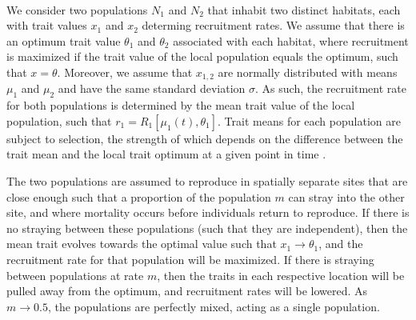 \documentclass[twocolumn,preprintnumbers,amsmath,amssymb,superscriptaddress]{revtex4}
\begin{document}
\\
\noindent We consider two populations $N_1$ and $N_2$ that inhabit two distinct habitats, each with trait values $x_1$ and $x_2$ determing recruitment rates.
We assume that there is an optimum trait value $\theta_1$ and $\theta_2$ associated with each habitat, where recruitment is maximized if the trait value of the local population equals the optimum, such that $x = \theta$.
Moreover, we assume that $x_{1,2}$ are normally distributed with means $\mu_1$ and $\mu_2$ and have the same standard deviation $\sigma$.
As such, the recruitment rate for both populations is determined by the mean trait value of the local population, such that $r_1 = R_1[\mu_1(t),\theta_1]$.
Trait means for each population are subject to selection, the strength of which depends on the difference between the trait mean and the local trait optimum at a given point in time \cite{simpson1953major,Lande:1976ga}.

The two populations are assumed to reproduce in spatially separate sites that are close enough such that a proportion of the population $m$ can stray into the other site, and where mortality occurs before individuals return to reproduce.
If there is no straying between these populations (such that they are independent), then the mean trait evolves towards the optimal value such that $x_1 \rightarrow \theta_1$, and the recruitment rate for that population will be maximized.
If there is straying between populations at rate $m$, then the traits in each respective location will be pulled away from the optimum, and recruitment rates will be lowered.
As $m \rightarrow 0.5$, the populations are perfectly mixed, acting as a single population.
\end{document}
